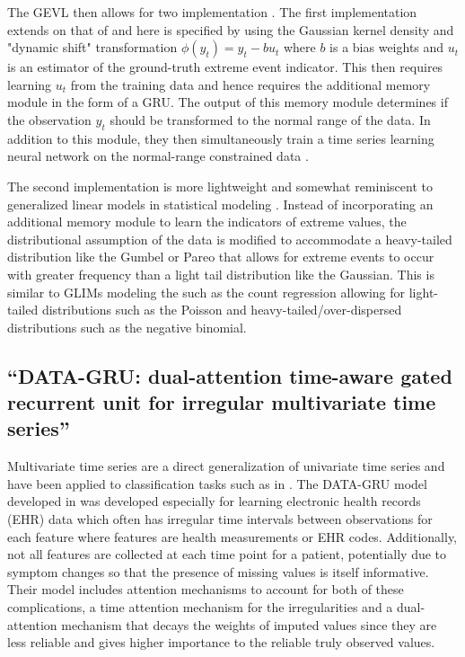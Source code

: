 \documentclass[conference]{IEEEtran}
\begin{document}
The GEVL then allows for two implementation \cite{zhangEnhancingTimeSeries2021}. The first implementation extends on that of \cite{dingModelingExtremeEvents2019} and here is specified by using the Gaussian kernel density and "dynamic shift" transformation $\phi(y_t) = y_t - bu_t$ where $b$ is a bias weights and $u_t$ is an estimator of the ground-truth extreme event indicator. This then requires learning $u_t$ from the training data and hence requires the additional memory module in the form of a GRU. The output of this memory module determines if the observation $y_t$ should be transformed to the normal range of the data. In addition to this module, they then simultaneously train a time series learning neural network on the normal-range constrained data \cite{zhangEnhancingTimeSeries2021}. 

The second implementation is more lightweight and somewhat reminiscent to generalized linear models in statistical modeling \cite{zhangEnhancingTimeSeries2021}. Instead of incorporating an additional memory module to learn the indicators of extreme values, the distributional assumption of the data is modified to accommodate a heavy-tailed distribution like the Gumbel or Pareo that allows for extreme events to occur with greater frequency than a light tail distribution like the Gaussian. This is similar to GLIMs modeling the such as the count regression allowing for light-tailed distributions such as the Poisson and heavy-tailed/over-dispersed distributions such as the negative binomial.

\subsection{“DATA-GRU: dual-attention time-aware gated recurrent unit for irregular multivariate time series” \cite{tanDATAGRUDualAttentionTimeAware2020}}

Multivariate time series are a direct generalization of univariate time series and have been applied to classification tasks such as in \cite{tanDATAGRUDualAttentionTimeAware2020}. The DATA-GRU model developed in \cite{tanDATAGRUDualAttentionTimeAware2020} was developed especially for learning electronic health records (EHR) data which often has irregular time intervals between observations for each feature where features are health measurements or EHR codes. Additionally, not all features are collected at each time point for a patient, potentially due to symptom changes so that the presence of missing values is itself informative. Their model includes attention mechanisms to account for both of these complications, a time attention mechanism for the irregularities and a dual-attention mechanism that decays the weights of imputed values since they are less reliable and gives higher importance to the reliable truly observed values. 
\end{document}
